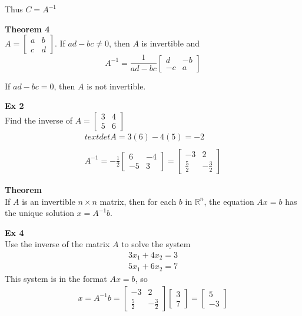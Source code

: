 \documentclass{article}
\begin{document}
  Thus $ C=A^{-1}  $ 
  
  \textbf{Theorem 4}\\
  $ A = \begin{bmatrix}
      a &b\\
      c &d
  \end{bmatrix} $. If $ ad-bc \neq 0$, then $ A $ is invertible and
  \[
      A^{-1}=\frac{1}{ad-bc} \begin{bmatrix}
          d &-b\\
          -c &a
      \end{bmatrix} 
  \]

  If $ ad-bc =0$, then $ A $ is not invertible. 

  \textbf{Ex 2}\\
  Find the inverse of $ A=\begin{bmatrix}
      3 &4\\
      5 &6
  \end{bmatrix} $
  \[
      \begin{gathered}
        text{det}A=3(6)-4(5)=-2\\
        ~\\
      A^{-1} = -\frac{1}{2}\begin{bmatrix}
          6 &-4\\
          -5 &3
      \end{bmatrix} =
      \begin{bmatrix}
          -3 &2\\
          \frac{5}{2}  &-\frac{3}{2} 
      \end{bmatrix}
      \end{gathered}
  \]
  
  \textbf{Theorem}\\
  If $ A $ is an invertible $ n \times n $ matrix, then for each $ b $ in $ \mathbb{R}^{n}$, the equation $ Ax=b $ has the unique solution $ x=A^{-1}b$.     
  

  \textbf{Ex 4}\\
  Use the inverse of the matrix $ A $ to solve the system
  \[
      \begin{gathered}
      3x_{1}+4x_{2}=3\\
      5x_{1}+6x_{2}=7    
      \end{gathered}
  \]
  This system is in the format $ Ax=b $, so
  \[
      \begin{gathered}
      x=A^{-1}b = 
      \begin{bmatrix}
          -3 &2\\
          \frac{5}{2} &-\frac{3}{2}  
      \end{bmatrix}
      \begin{bmatrix}
          3\\
          7
      \end{bmatrix} =
      \begin{bmatrix}
          5\\
          -3
      \end{bmatrix}
      \end{gathered}
  \]
  
\end{document}
